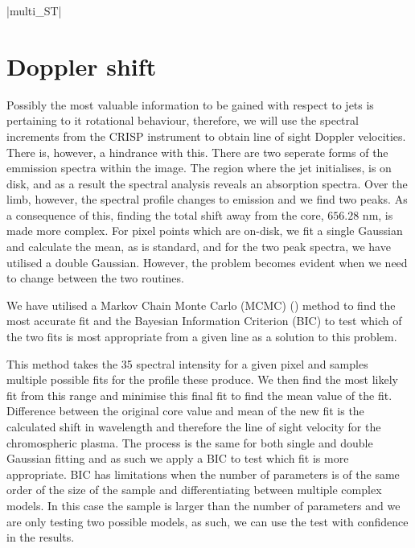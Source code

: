 \documentclass{emulateapj}
\begin{document}
\py[STEREO]|multi_ST|



\section{Doppler shift}
\label{dop_shift_sect}

Possibly the most valuable information to be gained with respect to jets is pertaining to it rotational behaviour, therefore, we will use the spectral increments from the CRISP instrument to obtain line of sight Doppler velocities.
There is, however, a hindrance with this.
There are two seperate forms of the emmission spectra within the image.
The region where the jet initialises, is on disk, and as a result the spectral analysis reveals an absorption spectra.
Over the limb, however, the spectral profile changes to emission and we find two peaks.
As a consequence of this, finding the total shift away from the core, $656.28$ nm, is made more complex.
For pixel points which are on-disk, we fit a single Gaussian and calculate the mean, as is standard, and for the two peak spectra, we have utilised a double Gaussian.
However, the problem becomes evident when we need to change between the two routines.

We have utilised a Markov Chain Monte Carlo (MCMC) (\cite{Richey2010}) method to find the most accurate fit and the Bayesian Information Criterion (BIC) to test which of the two fits is most appropriate from a given line as a solution to this problem.

This method takes the 35 spectral intensity for a given pixel and samples multiple possible fits for the profile these produce.
We then find the most likely fit from this range and minimise this final fit to find the mean value of the fit.
Difference between the original core value and mean of the new fit is the calculated shift in wavelength and therefore the line of sight velocity for the chromospheric plasma.
The process is the same for both single and double Gaussian fitting and as such we apply a BIC to test which fit is more appropriate.
BIC has limitations when the number of parameters is of the same order of the size of the sample and differentiating between multiple complex models.
In this case the sample is larger than the number of parameters and we are only testing two possible models, as such, we can use the test with confidence in the results.
\end{document}
